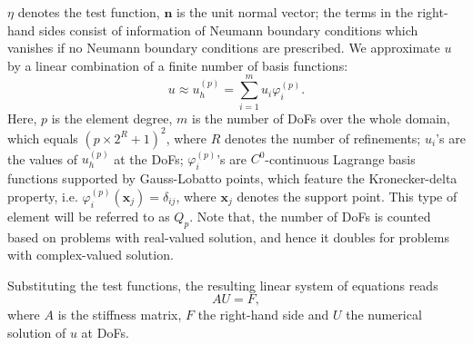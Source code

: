 \documentclass[review,3p]{elsarticle}
\begin{document}
\noindent$\eta$ denotes the test function, $\mathbf{n}$ is the unit normal vector; the terms in the right-hand sides consist of information of Neumann boundary conditions which vanishes if no Neumann boundary conditions are prescribed. We approximate $u$ by a linear combination of a finite number of basis functions:
\begin{equation}
 u \approx u_h ^{(p)} = \sum _ {i=1} ^{m} u _{i} \varphi _{i}^{(p)}. \label{sm_u_approx}%
\end{equation}
Here, $p$ is the element degree, $m$ is the number of DoFs over the whole domain, which equals $(p \times 2^R + 1)^2$, where $R$ denotes the number of refinements; $u_i$'s are the values of $u_h^{(p)}$ at the DoFs; $\varphi _{i}^{(p)}$'s are $C^0$-continuous Lagrange basis functions supported by Gauss-Lobatto points, which feature the Kronecker-delta property, i.e. $\varphi _{i}^{(p)} (\mathbf{x}_j)=\delta_{ij}$, where $\mathbf{x}_j$ denotes the support point. This type of element will be referred to as $Q_p$.
Note that, the number of DoFs is counted based on problems with real-valued solution, and hence it doubles for problems with complex-valued solution.

Substituting the test functions, the resulting linear system of equations reads
\begin{equation}
 A {U} = F,				\label{matrix_equation_std}
\end{equation}
where $A$ is the stiffness matrix, $F$ the right-hand side and $U$ the numerical solution of $u$ at DoFs.
\end{document}
